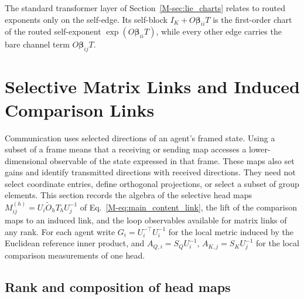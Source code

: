 \documentclass[twoside,11pt]{article}
\begin{document}
The standard transformer layer of Section~\ref{M-sec:lie_charts} relates to routed exponents only on the self-edge. Its self-block $I_K+O\boldsymbol\beta_{ii}T$ is the first-order chart of the routed self-exponent $\exp(O\boldsymbol\beta_{ii}T)$, while every other edge carries the bare channel term $O\boldsymbol\beta_{ij}T$.

\section{Selective Matrix Links and Induced Comparison Links}
\label{supp:matrix_links}
\label{sec:projection_link_geometry}

Communication uses selected directions of an agent's framed state. Using a subset of a frame means that a receiving or sending map accesses a lower-dimensional observable of the state expressed in that frame. These maps also set gains and identify transmitted directions with received directions. They need not select coordinate entries, define orthogonal projections, or select a subset of group elements. This section records the algebra of the selective head maps $M^{(h)}_{ij}=U_i\widetilde O_hT_hU_j^{-1}$ of Eq.~\eqref{M-eq:main_content_link}, the lift of the comparison maps to an induced link, and the loop observables available for matrix links of any rank. For each agent write $G_i=U_i^{-\top}U_i^{-1}$ for the local metric induced by the Euclidean reference inner product, and $A_{Q,i}=S_QU_i^{-1}$, $A_{K,j}=S_KU_j^{-1}$ for the local comparison measurements of one head.

\subsection{Rank and composition of head maps}
\label{supp:link_rank}
\end{document}
